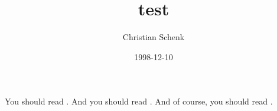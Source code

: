 \documentclass[a4paper,10pt,notitlepage]{article}
\begin{document}
\title{test}
\author{Christian Schenk}
\date{1998-12-10}
You should read \cite{kn:a}.
And you should read \cite{kn:b}.
And of course, you should read \cite{kn:c}.


\end{document}
